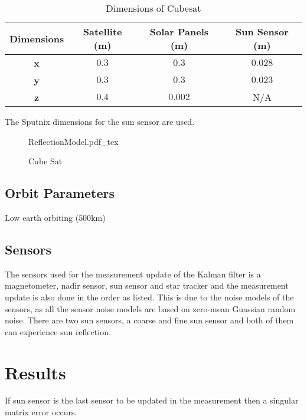 \documentclass[letterpaper, 10 pt, conference]{ieeeconf}  %
\begin{document}
\begin{table}[!htb]
	\caption{\label{Table:Dimensions}Dimensions of Cubesat}
	\begin{tabular}{|c|c|c|c|}
		\hline
		\textbf{Dimensions} & \textbf{Satellite (m)} & \textbf{Solar Panels (m)} & \textbf{Sun Sensor (m)} \\ \hline
		\textbf{x}          & $0.3$                    & $0.3$                       & $0.028$                   \\ \hline
		\textbf{y}          & $0.3$                    & $0.3$                       & $0.023$                   \\ \hline
		\textbf{z}          & $0.4$                    & $0.002$                     & N/A                     \\ \hline
	\end{tabular}
\end{table}
The Sputnix dimensions for the sun sensor are used.
\begin{figure}[!htb]
	\centering
	\def\svgwidth{7cm}
	{ReflectionModel.pdf_tex}
	\caption{Cube Sat}
	\label{fig:CubeSat}
\end{figure}

\subsection{Orbit Parameters}
Low earth orbiting ($500$km)

\subsection{Sensors}
The sensors used for the measurement update of the Kalman filter is a magnetometer, nadir sensor, sun sensor and star tracker and the measurement update is also done in the order as listed. This is due to the noise models of the sensors, as all the sensor noise models are based on zero-mean Guassian random noise. There are two sun sensors, a coarse and fine sun sensor and both of them can experience sun reflection.

\section{Results}
\label{section:Results}
If sun sensor is the last sensor to be updated in the measurement then a singular matrix error occurs.
\end{document}
